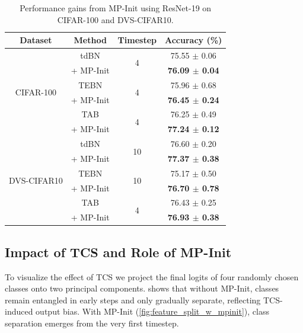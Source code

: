 \begin{table}[t]
\small
\centering
\begin{tabular}{cccc}
\toprule
\textbf{Dataset}     & \textbf{Method}    & \textbf{Timestep} & \textbf{Accuracy (\%)} \\
\toprule
\multirow{6}{*}{CIFAR-100}    & tdBN      & \multirow{2}{*}{4} & 75.55 $\pm$ 0.06 \\
                             & + MP-Init &                    & \textbf{76.09 $\pm$ 0.04}    \\
\cline{2-4}
                             & TEBN      & \multirow{2}{*}{4} & 75.96 $\pm$ 0.68    \\
                             & + MP-Init &                    & \textbf{76.45 $\pm$ 0.24}    \\
\cline{2-4}
                             & TAB       & \multirow{2}{*}{4} & 76.25 $\pm$ 0.49    \\
                             & + MP-Init &                    & \textbf{77.24 $\pm$ 0.12}    \\
\hline
\multirow{6}{*}{DVS-CIFAR10} & tdBN      & \multirow{2}{*}{10} & 76.60 $\pm$ 0.20    \\
                             & + MP-Init &                     & \textbf{77.37 $\pm$ 0.38}    \\
\cline{2-4}
                             & TEBN      & \multirow{2}{*}{10} & 75.17 $\pm$ 0.50    \\
                             & + MP-Init &                     & \textbf{76.70 $\pm$ 0.78}    \\
\cline{2-4}
                             & TAB       & \multirow{2}{*}{4} & 76.43 $\pm$ 0.25    \\
                             & + MP-Init &                     & \textbf{76.93 $\pm$ 0.38}    \\
\bottomrule
\end{tabular}
\caption{Performance gains from MP-Init using ResNet-19 on CIFAR-100 and DVS-CIFAR10.}
\label{tab:mpinit_acc_impr}
\end{table}

\subsection{Impact of TCS and Role of MP-Init}
\label{subsec:exp_pca}

To visualize the effect of TCS we project the final logits of four randomly chosen classes onto two principal components.  shows that without MP-Init, classes remain entangled in early steps and only gradually separate, reflecting TCS-induced output bias. With MP-Init (\cref{fig:feature_split_w_mpinit}), class separation emerges from the very first timestep.

